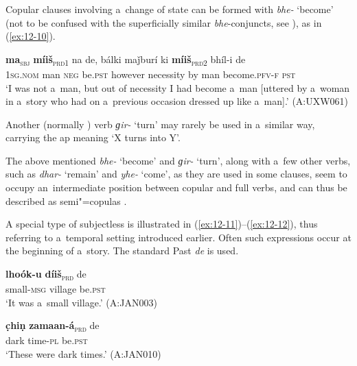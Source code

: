 Copular clauses involving a~change of state can be formed with \textit{bhe-} `become' (not to be confused with the superficially similar \textit{bhe}-conjuncts, see ), as in (\ref{ex:12-10}).

\begin{exe}
\ex
\label{ex:12-10}
\gll {\ob}\textbf{ma}{\cb}\textsubscript{\textsc{\upshape sbj}} {\ob}\textbf{míiš}{\cb}\textsubscript{\textsc{\upshape prd1}} na de, bálki maǰburí ki {\ob}\textbf{míiš}{\cb}\textsubscript{\textsc{\upshape prd2}} bhíl-i de \\
\textsc{1sg.nom} man \textsc{neg} be.\textsc{pst}  however necessity by man become.\textsc{pfv-f} \textsc{pst} \\
\glt `I was not a~man, but out of necessity I had become a~man [uttered by a~woman in a~story who had on a~previous occasion dressed up like a~man].' (A:UXW061)
\end{exe}

Another (normally ) verb \textit{ɡir-} `turn' may rarely be used in a~similar way, carrying the ap meaning `X turns into Y'.



The above mentioned \textit{bhe-} `become' and \textit{ɡir-} `turn', along with a~few other verbs, such as \textit{dhar-} `remain' and \textit{yhe-} `come', as they are used in some clauses, seem to occupy an~intermediate position between copular and full verbs, and can thus be described as semi"=copulas \citep[5--6]{pustet2003}. 



A special type of subjectless  is illustrated in (\ref{ex:12-11})--(\ref{ex:12-12}), thus referring to a~temporal setting introduced earlier. Often such expressions occur at the beginning of a~story. The standard Past  \textit{de} is used.

\begin{exe}
\ex
\label{ex:12-11}
\gll {\ob}\textbf{lhoók-u} \textbf{díiš}{\cb}\textsubscript{\textsc{\upshape prd}} de \\
small-\textsc{msg} village be.\textsc{pst} \\
\glt `It was a~small village.' (A:JAN003)
\end{exe}
\begin{exe}
\ex
\label{ex:12-12}
\gll {\ob}\textbf{c̣hiṇ} \textbf{zamaan-á}{\cb}\textsubscript{\textsc{\upshape prd}} de \\
dark time-\textsc{pl} be.\textsc{pst} \\
\glt `These were dark times.' (A:JAN010)
\end{exe}

